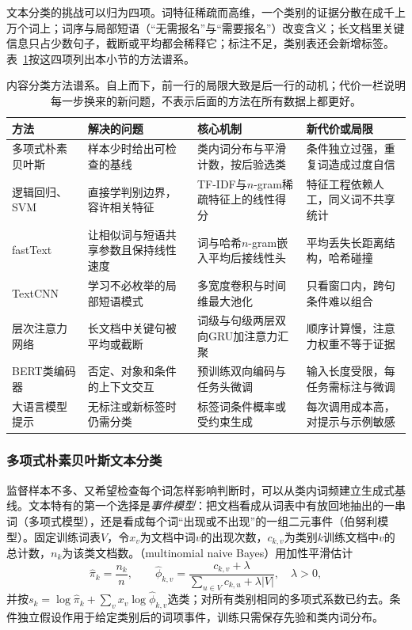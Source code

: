 文本分类的挑战可以归为四项。词特征稀疏而高维，一个类别的证据分散在成千上万个词上；词序与局部短语（“无需报名”与“需要报名”）改变含义；长文档里关键信息只占少数句子，截断或平均都会稀释它；标注不足，类别表还会新增标签。表~\ref{tab:nlp-classification-content-methods}按这四项列出本小节的方法谱系。

\begin{table}[htbp]
  \centering
  \small
  \begin{tabularx}{\linewidth}{@{}>{\raggedright\arraybackslash}p{24mm}
    >{\raggedright\arraybackslash}X>{\raggedright\arraybackslash}X
    >{\raggedright\arraybackslash}X@{}}
    \toprule
    方法 & 解决的问题 & 核心机制 & 新代价或局限 \\
    \midrule
    多项式朴素贝叶斯 & 样本少时给出可检查的基线 & 类内词分布与平滑计数，按后验选类 & 条件独立过强，重复词造成过度自信 \\
    逻辑回归、SVM & 直接学判别边界，容许相关特征 & TF-IDF与$n$-gram稀疏特征上的线性得分 & 特征工程依赖人工，同义词不共享统计 \\
    fastText & 让相似词与短语共享参数且保持线性速度 & 词与哈希$n$-gram嵌入平均后接线性头 & 平均丢失长距离结构，哈希碰撞 \\
    TextCNN & 学习不必枚举的局部短语模式 & 多宽度卷积与时间维最大池化 & 只看窗口内，跨句条件难以组合 \\
    层次注意力网络 & 长文档中关键句被平均或截断 & 词级与句级两层双向GRU加注意力汇聚 & 顺序计算慢，注意力权重不等于证据 \\
    BERT类编码器 & 否定、对象和条件的上下文交互 & 预训练双向编码与任务头微调 & 输入长度受限，每任务需标注与微调 \\
    大语言模型提示 & 无标注或新标签时仍需分类 & 标签词条件概率或受约束生成 & 每次调用成本高，对提示与示例敏感 \\
    \bottomrule
  \end{tabularx}
  \caption{内容分类方法谱系。自上而下，前一行的局限大致是后一行的动机；代价一栏说明每一步换来的新问题，不表示后面的方法在所有数据上都更好。}
  \label{tab:nlp-classification-content-methods}
\end{table}

\subsubsection{多项式朴素贝叶斯文本分类}
\label{sec:nlp-classification-naive-bayes}

监督样本不多、又希望检查每个词怎样影响判断时，可以从类内词频建立生成式基线。文本特有的第一个选择是\emph{事件模型}：把文档看成从词表中有放回地抽出的一串词（多项式模型），还是看成每个词“出现或不出现”的一组二元事件（伯努利模型）。固定训练词表$V$，令$x_v$为文档中词$v$的出现次数，$c_{k,v}$为类别$k$训练文档中$v$的总计数，$n_k$为该类文档数。（multinomial naive Bayes）用加性平滑估计
\[
  \widehat\pi_k=\frac{n_k}{n},\qquad
  \widehat\phi_{k,v}
  =\frac{c_{k,v}+\lambda}{\sum_{u\in V}c_{k,u}+\lambda|V|},
  \quad \lambda>0,
\]
并按$s_k=\log\widehat\pi_k+\sum_vx_v\log\widehat\phi_{k,v}$选类；对所有类别相同的多项式系数已约去。条件独立假设作用于给定类别后的词项事件，训练只需保存先验和类内词分布。

